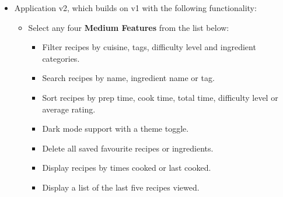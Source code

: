\documentclass{article}
\begin{document}
\begin{itemize}
\begin{itemize}
    \item \textbf{Favourites Screen Features}:
    \begin{itemize}
      \item Display a list of saved favourite recipes.
      \item Each item should show the recipe's name, image and average rating.
      \item Tapping an item should navigate to the \textbf{Recipe Details Screen}.
    \end{itemize}

    \item \textbf{Ingredients Screen Features}:
    \begin{itemize}
      \item Display a list of saved ingredients grouped by category.
      \item Each item should display the ingredient name, quantity and category.
      \item Display a trash icon. Tapping it removes the ingredient and saves the changes.
    \end{itemize}
  \end{itemize}

\item Application v2, which builds on v1 with the following functionality:
  \begin{itemize}
    \item Select any four \textbf{Medium Features} from the list below:
    \begin{itemize}
      \item Filter recipes by cuisine, tags, difficulty level and ingredient categories.
      \item Search recipes by name, ingredient name or tag.
      \item Sort recipes by prep time, cook time, total time, difficulty level or average rating.
      \item Dark mode support with a theme toggle.
      \item Delete all saved favourite recipes or ingredients.
      \item Display recipes by times cooked or last cooked.
      \item Display a list of the last five recipes viewed.
    \end{itemize}


\end{itemize}
\end{itemize}
\end{document}
